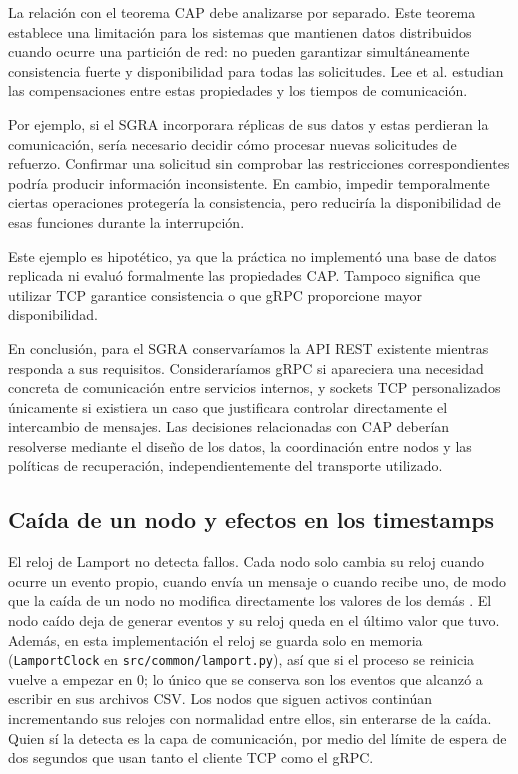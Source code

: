 La relación con el teorema CAP debe analizarse por separado. Este teorema establece una limitación para los sistemas que mantienen datos distribuidos cuando ocurre una partición de red: no pueden garantizar simultáneamente consistencia fuerte y disponibilidad para todas las solicitudes. Lee et al. \cite{lee2023cap} estudian las compensaciones entre estas propiedades y los tiempos de comunicación.

Por ejemplo, si el SGRA incorporara réplicas de sus datos y estas perdieran la comunicación, sería necesario decidir cómo procesar nuevas solicitudes de refuerzo. Confirmar una solicitud sin comprobar las restricciones correspondientes podría producir información inconsistente. En cambio, impedir temporalmente ciertas operaciones protegería la consistencia, pero reduciría la disponibilidad de esas funciones durante la interrupción.

Este ejemplo es hipotético, ya que la práctica no implementó una base de datos replicada ni evaluó formalmente las propiedades CAP. Tampoco significa que utilizar TCP garantice consistencia o que gRPC proporcione mayor disponibilidad.

En conclusión, para el SGRA conservaríamos la API REST existente mientras responda a sus requisitos. Consideraríamos gRPC si apareciera una necesidad concreta de comunicación entre servicios internos, y sockets TCP personalizados únicamente si existiera un caso que justificara controlar directamente el intercambio de mensajes. Las decisiones relacionadas con CAP deberían resolverse mediante el diseño de los datos, la coordinación entre nodos y las políticas de recuperación, independientemente del transporte utilizado.

\subsection{Caída de un nodo y efectos en los timestamps}

El reloj de Lamport no detecta fallos. Cada nodo solo cambia su reloj cuando ocurre un evento propio, cuando envía un mensaje o cuando recibe uno, de modo que la caída de un nodo no modifica directamente los valores de los demás \cite{lamport1978clocks}. El nodo caído deja de generar eventos y su reloj queda en el último valor que tuvo. Además, en esta implementación el reloj se guarda solo en memoria (\texttt{LamportClock} en \texttt{src/common/lamport.py}), así que si el proceso se reinicia vuelve a empezar en 0; lo único que se conserva son los eventos que alcanzó a escribir en sus archivos CSV. Los nodos que siguen activos continúan incrementando sus relojes con normalidad entre ellos, sin enterarse de la caída. Quien sí la detecta es la capa de comunicación, por medio del límite de espera de dos segundos que usan tanto el cliente TCP como el gRPC.

